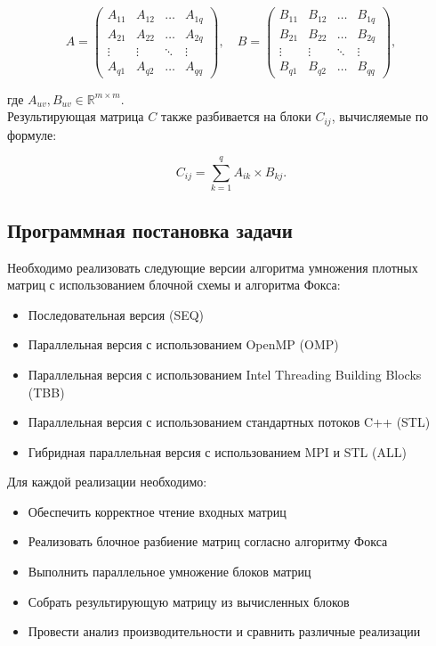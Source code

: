 \documentclass[12pt]{article}
\begin{document}
\[
A = \begin{pmatrix}
A_{11} & A_{12} & \dots & A_{1q} \\
A_{21} & A_{22} & \dots & A_{2q} \\
\vdots & \vdots & \ddots & \vdots \\
A_{q1} & A_{q2} & \dots & A_{qq}
\end{pmatrix}, \quad
B = \begin{pmatrix}
B_{11} & B_{12} & \dots & B_{1q} \\
B_{21} & B_{22} & \dots & B_{2q} \\
\vdots & \vdots & \ddots & \vdots \\
B_{q1} & B_{q2} & \dots & B_{qq}
\end{pmatrix},
\]

где $A_{uv}, B_{uv} \in \mathbb{R}^{m \times m}$.\\
Результирующая матрица $C$ также разбивается на блоки $C_{ij}$, вычисляемые по формуле:

\[
C_{ij} = \sum_{k=1}^{q} A_{ik} \times B_{kj}.
\]

\subsection{Программная постановка задачи}
Необходимо реализовать следующие версии алгоритма умножения плотных матриц с использованием блочной схемы и алгоритма Фокса:

\begin{itemize}
    \item Последовательная версия (SEQ)
    \item Параллельная версия с использованием OpenMP (OMP)
    \item Параллельная версия с использованием Intel Threading Building Blocks (TBB)
    \item Параллельная версия с использованием стандартных потоков C++ (STL)
    \item Гибридная параллельная версия с использованием MPI и STL (ALL)
\end{itemize}

Для каждой реализации необходимо:

\begin{itemize}
    \item Обеспечить корректное чтение входных матриц
    \item Реализовать блочное разбиение матриц согласно алгоритму Фокса
    \item Выполнить параллельное умножение блоков матриц
    \item Собрать результирующую матрицу из вычисленных блоков
    \item Провести анализ производительности и сравнить различные реализации
\end{itemize}
\end{document}
